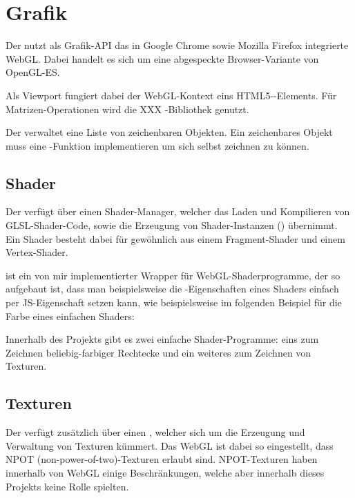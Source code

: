 \chapter{Grafik}

Der  nutzt als Grafik-API das in Google Chrome sowie Mozilla Firefox integrierte WebGL. Dabei handelt es sich um eine abgespeckte Browser-Variante von OpenGL-ES. 

Als Viewport fungiert dabei der WebGL-Kontext eins HTML5--Elements. Für Matrizen-Operationen wird die XXX  -Bibliothek genutzt.

Der  verwaltet eine Liste von zeichenbaren Objekten. Ein zeichenbares Objekt muss eine -Funktion implementieren um sich selbst zeichnen zu können.

\section{Shader}

Der  verfügt über einen Shader-Manager, welcher das Laden und Kompilieren von GLSL-Shader-Code, sowie die Erzeugung von Shader-Instanzen () übernimmt. Ein Shader besteht dabei für gewöhnlich aus einem Fragment-Shader und einem Vertex-Shader. 

 ist ein von mir implementierter Wrapper für WebGL-Shaderprogramme, der so aufgebaut ist, dass man beispielsweise die -Eigenschaften eines Shaders einfach per JS-Eigenschaft setzen kann, wie beispielsweise im folgenden Beispiel für die Farbe eines einfachen Shaders:


Innerhalb des Projekts gibt es zwei einfache Shader-Programme: eins zum Zeichnen beliebig-farbiger Rechtecke und ein weiteres zum Zeichnen von Texturen. 

\section{Texturen}

Der  verfügt zusätzlich über einen , welcher sich um die Erzeugung und Verwaltung von Texturen kümmert. Das WebGL ist dabei so eingestellt, dass NPOT (non-power-of-two)-Texturen erlaubt sind. NPOT-Texturen haben innerhalb von WebGL einige Beschränkungen, welche aber innerhalb dieses Projekts keine Rolle spielten.

